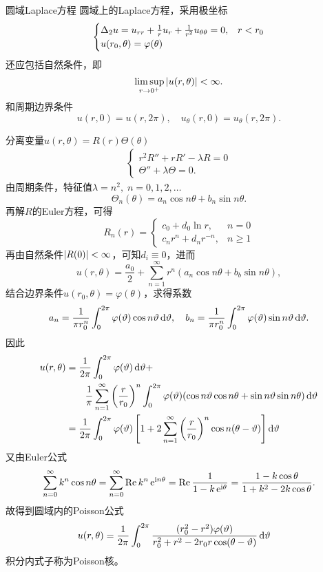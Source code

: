 \begin{example}{圆域Laplace方程}{}
	圆域上的Laplace方程，采用极坐标
	\begin{align*}
		\begin{cases}
			\Delta_2u=u_{rr}+\frac1ru_r+\frac1{r^2}u_{\theta\theta}=0,&r<r_0\\
			u(r_0,\theta)=\varphi(\theta)
		\end{cases}
	\end{align*}
	还应包括自然条件，即
	\[
		\limsup_{r\to0^+}\left\lvert u(r,\theta)\right\rvert<\infty.
	\]
	和周期边界条件
	\[
		u(r,0)=u(r,2\pi),\quad u_\theta(r,0)=u_\theta(r,2\pi).
	\]
	
	分离变量$u(r,\theta)=R(r)\varTheta(\theta)$
	\begin{align*}
		\begin{cases}
			r^2R''+rR'-\lambda R=0\\
			\varTheta''+\lambda\varTheta=0.
		\end{cases}
	\end{align*}
	由周期条件，特征值$\lambda=n^2,\;n=0,1,2,\ldots$
	\[
		\varTheta_n(\theta)=a_n\cos n\theta+b_n\sin n\theta.
	\]
	再解$R$的Euler方程，可得
	\[
		R_n(r)=
		\begin{cases}
			c_0+d_0\ln r,&n=0\\
			c_nr^n+d_nr^{-n},&n\geqslant 1
		\end{cases}
	\]
	再由自然条件$\left\lvert R(0)\right\rvert<\infty$，可知$d_i\equiv 0$，进而
	\[
		u(r,\theta)=\frac{a_0}2+\sum_{n=1}^\infty r^n(a_n\cos n\theta+b_b\sin n\theta),
	\]
	结合边界条件$u(r_0,\theta)=\varphi(\theta)$，求得系数
	\[
		a_n=\frac1{\pi r_0^n}\int_0^{2\pi}\varphi(\vartheta)\cos n\vartheta\mathop{}\!\mathrm{d}\vartheta,\quad b_n=\frac1{\pi r_0^n}\int_0^{2\pi}\varphi(\vartheta)\sin n\vartheta\mathop{}\!\mathrm{d}\vartheta.
	\]
	因此
	\begin{align*}
		u(r,\theta)&=\frac1{2\pi}\int_0^{2\pi}\varphi(\vartheta)\mathop{}\!\mathrm{d}\vartheta+\\
		&\qquad\frac1\pi\sum_{n=1}^\infty\left(\frac r{r_0}\right)^n\int_0^{2\pi}\varphi(\vartheta)(\cos n\vartheta\cos n\theta+\sin n\vartheta\sin n\theta)\mathop{}\!\mathrm{d}\vartheta\\
		&=\frac1{2\pi}\int_0^{2\pi}\varphi(\vartheta)\left[1+2\sum_{n=1}^\infty\left(\frac r{r_0}\right)^n\cos n(\theta-\vartheta)\right]\mathop{}\!\mathrm{d}\vartheta
	\end{align*}
	又由Euler公式
	\begin{align*}
	\sum_{n=0}^\infty k^n\cos n\theta=\sum_{n=0}^\infty\operatorname{Re} k^n\mathop{}\!\mathrm{e}^{\mathrm{i} n\theta}=\operatorname{Re}\frac1{1-k\mathop{}\!\mathrm{e}^{\mathrm{i}\theta}}=\frac{1-k\cos\theta}{1+k^2-2k\cos\theta}.
	\end{align*}
	故得到圆域内的Poisson公式
	\begin{align}
		u(r,\theta)&=\frac1{2\pi}\int_0^{2\pi}\frac{(r_0^2-r^2)\varphi(\vartheta)}{r_0^2+r^2-2r_0r\cos(\theta-\vartheta)}\mathop{}\!\mathrm{d}\vartheta
	\end{align}
	积分内式子称为Poisson核。
\end{example}
